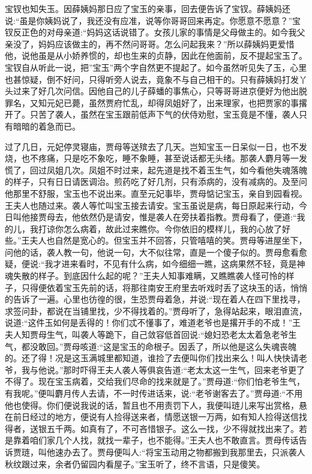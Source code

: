 \begin{parag}
    宝钗也知失玉。因薛姨妈那日应了宝玉的亲事，回去便告诉了宝钗。薛姨妈还说:“虽是你姨妈说了，我还没有应准，说等你哥哥回来再定。你愿意不愿意？”宝钗反正色的对母亲道:“妈妈这话说错了。女孩儿家的事情是父母做主的。如今我父亲没了，妈妈应该做主的，再不然问哥哥。怎么问起我来？”所以薛姨妈更爱惜他，说他虽是从小娇养惯的，却也生来的贞静，因此在他面前，反不提起宝玉了。宝钗自从听此一说，把”宝玉”两个字自然更不提起了。如今虽然听见失了玉，心里也甚惊疑，倒不好问，只得听旁人说去，竟象不与自己相干的。只有薛姨妈打发丫头过来了好几次问信。因他自己的儿子薛蟠的事焦心，只等哥哥进京便好为他出脱罪名，又知元妃已薨，虽然贾府忙乱，却得凤姐好了，出来理家，也把贾家的事撂开了。只苦了袭人，虽然在宝玉跟前低声下气的伏侍劝慰，宝玉竟是不懂，袭人只有暗暗的着急而已。
\end{parag}


\begin{parag}
    过了几日，元妃停灵寝庙，贾母等送殡去了几天。岂知宝玉一日呆似一日，也不发烧，也不疼痛，只是吃不象吃，睡不象睡，甚至说话都无头绪。那袭人麝月等一发慌了，回过凤姐几次。凤姐不时过来，起先道是找不着玉生气，如今看他失魂落魄的样子，只有日日请医调治。煎药吃了好几剂，只有添病的，没有减病的。及至问他那里不舒服，宝玉也不说出来。直至元妃事毕，贾母惦记宝玉，亲自到园看视。王夫人也随过来。袭人等忙叫宝玉接去请安。宝玉虽说是病，每日原起来行动，今日叫他接贾母去，他依然仍是请安，惟是袭人在旁扶着指教。贾母看了，便道:“我的儿，我打谅你怎么病着，故此过来瞧你。今你依旧的模样儿，我的心放了好些。”王夫人也自然是宽心的。但宝玉并不回答，只管嘻嘻的笑。贾母等进屋坐下，问他的话，袭人教一句，他说一句，大不似往常，直是一个傻子似的。贾母愈看愈疑，便说:“我才进来看时，不见有什么病，如今细细一瞧，这病果然不轻，竟是神魂失散的样子。到底因什么起的呢？”王夫人知事难瞒，又瞧瞧袭人怪可怜的样子，只得便依着宝玉先前的话，将那往南安王府里去听戏时丢了这块玉的话，悄悄的告诉了一遍。心里也彷徨的很，生恐贾母着急，并说:“现在着人在四下里找寻，求签问卦，都说在当铺里找，少不得找着的。”贾母听了，急得站起来，眼泪直流，说道:“这件玉如何是丢得的！你们忒不懂事了，难道老爷也是撂开手的不成！”王夫人知贾母生气，叫袭人等跪下，自己敛容低首回说:“媳妇恐老太太着急老爷生气，都没敢回。”贾母咳道:“这是宝玉的命根子。因丢了，所以他是这么失魂丧魄的。还了得！况是这玉满城里都知道，谁捡了去便叫你们找出来么！叫人快快请老爷，我与他说。”那时吓得王夫人袭人等俱哀告道:“老太太这一生气，回来老爷更了不得了。现在宝玉病着，交给我们尽命的找来就是了。”贾母道:“你们怕老爷生气，有我呢。”便叫麝月传人去请，不一时传进话来，说:“老爷谢客去了。”贾母道:“不用他也使得。你们便说我说的话，暂且也不用责罚下人，我便叫琏儿来写出赏格，悬在前日经过的地方，便说有人捡得送来者，情愿送银一万两，如有知人捡得送信找得者，送银五千两。如真有了，不可吝惜银子。这么一找，少不得就找出来了。若是靠着咱们家几个人找，就找一辈子，也不能得。”王夫人也不敢直言。贾母传话告诉贾琏，叫他速办去了。贾母便叫人:“将宝玉动用之物都搬到我那里去，只派袭人秋纹跟过来，余者仍留园内看屋子。”宝玉听了，终不言语，只是傻笑。
\end{parag}


